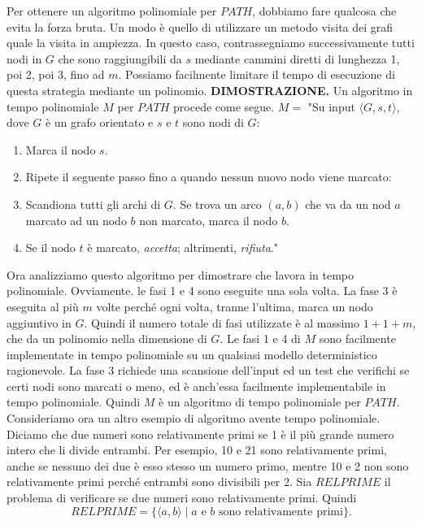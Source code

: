 \documentclass{article}
\begin{document}
Per ottenere un algoritmo polinomiale per $PATH$, dobbiamo fare qualcosa che evita la forza bruta. 
Un modo è quello di utilizzare un metodo visita dei grafi quale la visita in ampiezza. 
In questo caso, contrassegniamo successivamente tutti nodi in $G$ che sono raggiungibili da $s$ mediante cammini diretti di lunghezza 1, poi 2, poi 3, fino ad $m$.
Possiamo facilmente limitare il tempo di esecuzione di questa strategia mediante un polinomio.
\vspace{1em}
\text{}
\newline
\textbf{DIMOSTRAZIONE.}
Un algoritmo in tempo polinomiale $M$ per $PATH$ procede come segue.
\newline
$M =$ "Su input $\langle G, s, t \rangle$, dove $G$ è un grafo orientato e $s$ e $t$ sono nodi di $G$:
\begin{enumerate}
    \item Marca il nodo $s$.
    \item Ripete il seguente passo fino a quando nessun nuovo nodo viene marcato:
    \item \quad Scandiona tutti gli archi di $G$. Se trova un arco $(a,b)$ che va da un nod $a$ marcato ad un nodo $b$ non marcato, marca il nodo $b$.
    \item Se il nodo $t$ è marcato, \textit{accetta}; altrimenti, \textit{rifiuta}."
\end{enumerate}
Ora analizziamo questo algoritmo per dimostrare che lavora in tempo polinomiale.
Ovviamente. le fasi 1 e 4 sono eseguite una sola volta. 
La fase 3 è eseguita al più $m$ volte perché ogni volta, tranne l'ultima, marca un nodo aggiuntivo in $G$.
Quindi il numero totale di fasi utilizzate è al massimo $1 + 1 + m$, che da un polinomio nella dimensione di $G$.
Le fasi 1 e 4 di $M$ sono facilmente implementate in tempo polinomiale
su un qualsiasi modello deterministico ragionevole. 
La fase 3 richiede una scansione dell'input ed un test che verifichi se certi nodi sono marcati o meno, ed è anch'essa facilmente implementabile in tempo polinomiale. 
Quindi $M$ è un algoritmo di tempo polinomiale per $PATH$.
\vspace{1em}
\text{}
\newline
Consideriamo ora un altro esempio di algoritmo avente tempo polinomiale.
Diciamo che due numeri sono relativamente primi se 1 è il più grande numero intero che li divide entrambi.
Per esempio, 10 e 21 sono relativamente primi, anche se nessuno dei due è esso stesso un numero primo, mentre 10 e 2 non sono relativamente primi perché entrambi sono divisibili per 2. 
Sia $RELPRIME$ il problema di verificare se due numeri sono relativamente primi. Quindi
$$
RELPRIME = \{ \langle a, b \rangle \mid a \text{ e } b \text{ sono relativamente primi} \}.
$$
\end{document}

